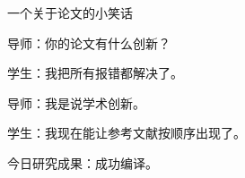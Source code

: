 \documentclass[12pt]{article}
\begin{document}
\begin{center}
  {\LARGE 一个关于论文的小笑话}
\end{center}

\bigskip
\noindent 导师：你的论文有什么创新？

\medskip
\noindent 学生：我把所有报错都解决了。

\medskip
\noindent 导师：我是说学术创新。

\medskip
\noindent 学生：我现在能让参考文献按顺序出现了。

\bigskip
\begin{center}
  今日研究成果：成功编译。
\end{center}
\end{document}
